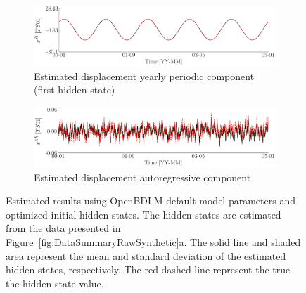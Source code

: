 \begin{figure}[h!]
\ContinuedFloat
\begin{subfigure}{\linewidth}
\includegraphics[width=0.9\linewidth]{./docfigs/Example_SYNTHETIC/optim_param_optim_initialhiddenstate/TS01_S1_4.pdf}
\caption{Estimated displacement yearly periodic component (first hidden state)}
\end{subfigure}
\begin{subfigure}{\linewidth}
\includegraphics[width=0.9\linewidth]{./docfigs/Example_SYNTHETIC/optim_param_optim_initialhiddenstate/TS01_AR_6.pdf} 
\caption{Estimated displacement autoregressive component}
\end{subfigure}
\caption{Estimated results using OpenBDLM default model parameters and optimized initial hidden states. The hidden states are estimated from the data presented in Figure~\ref{fig:DataSummaryRawSynthetic}a. The solid line and shaded area represent the mean and standard deviation of the estimated hidden states, respectively. The red dashed line represent the true the hidden state value.}
\label{fig:SYNTHETICOptimizedOptimized}
\end{figure}


